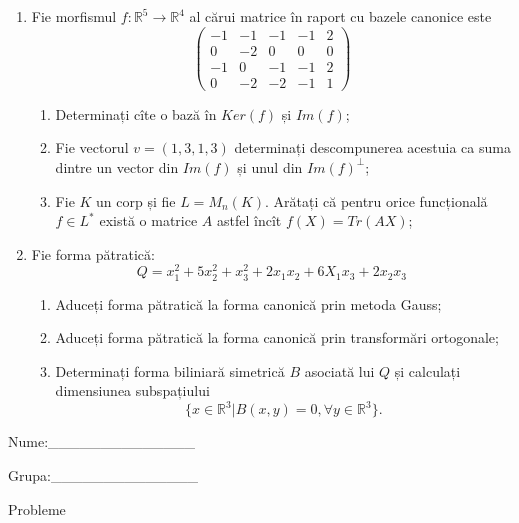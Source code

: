 \documentclass{article}
\begin{document}
\begin{enumerate}
 \item Fie morfismul $f:\mathbb{R}^5 \to \mathbb{R}^4$ al cărui matrice în raport cu bazele canonice este
$$\begin{pmatrix}
-1&-1&-1&-1&2\\
0&-2&0&0&0\\
-1&0&-1&-1&2\\
0&-2&-2&-1&1
\end{pmatrix}$$

\begin{enumerate}
\item Determinați cîte o bază în $Ker(f)$ și $Im(f)$;
\item Fie vectorul $v=(1,3,1,3)$ determinați descompunerea acestuia ca suma dintre un vector din $Im(f)$ și unul din $Im(f)^\perp$;
\item Fie $K$ un corp și fie $L=M_n(K)$. Arătați că pentru orice funcțională $f \in L^*$ există o matrice $A$ astfel încît $f(X)=Tr(AX)$;
\end{enumerate}
\item Fie forma pătratică:
$$Q= x_1^2+5x_2^2+x_3^2+2x_1x_2+6X_1x_3+2x_2x_3$$

\begin{enumerate}
\item Aduceți forma pătratică la forma canonică prin metoda Gauss;
\item Aduceți forma pătratică la forma canonică prin transformări ortogonale;
\item Determinați forma biliniară simetrică $B$ asociată lui $Q$ și calculați dimensiunea subspațiului
$$\{x \in \mathbb{R}^3 | B(x,y)=0,\forall y \in \mathbb{R}^3\}.$$

\end{enumerate}
\end{enumerate}
\newpage
\begin{flushright}
Nume:\_\_\_\_\_\_\_\_\_\_\_\_\_\_
 
 
Grupa:\_\_\_\_\_\_\_\_\_\_\_\_\_\_
\end{flushright}
\begin{center}
\vspace{2cm}
{\Large Probleme}
\vspace{2cm}
\end{center}
\end{document}
